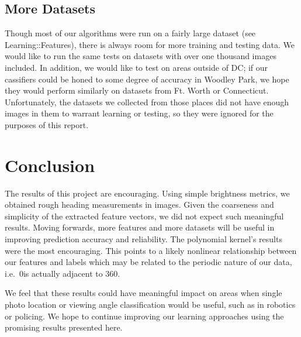 \documentclass{article}
\begin{document}
\subsection{More Datasets}
Though most of our algorithms were run on a fairly large dataset (see Learning::Features), there is always room for more training and testing data. We would like to run the same tests on datasets with over one thousand images included. In addition, we would like to test on areas outside of DC; if our cassifiers could be honed to some degree of accuracy in Woodley Park, we hope they would perform similarly on datasets from Ft. Worth or Connecticut. Unfortunately, the datasets we collected from those places did not have enough images in them to warrant learning or testing, so they were ignored for the purposes of this report. 

\section{Conclusion}

The results of this project are encouraging. Using simple brightness metrics, we obtained rough heading measurements in images. Given the coarseness and simplicity of the extracted feature vectors, we did not expect such meaningful results. Moving forwards, more features and more datasets will be useful in improving prediction accuracy and reliability. The polynomial kernel's results were the most encouraging. This points to a likely nonlinear relationship between our features and labels which may be related to the periodic nature of our data, i.e.\ 0\degrees is actually adjacent to 360\degrees.

We feel that these results could have meaningful impact on areas when single photo location or viewing angle classification would be useful, such as in robotics or policing. We hope to continue improving our learning approaches using the promising results presented here.



\end{document}
